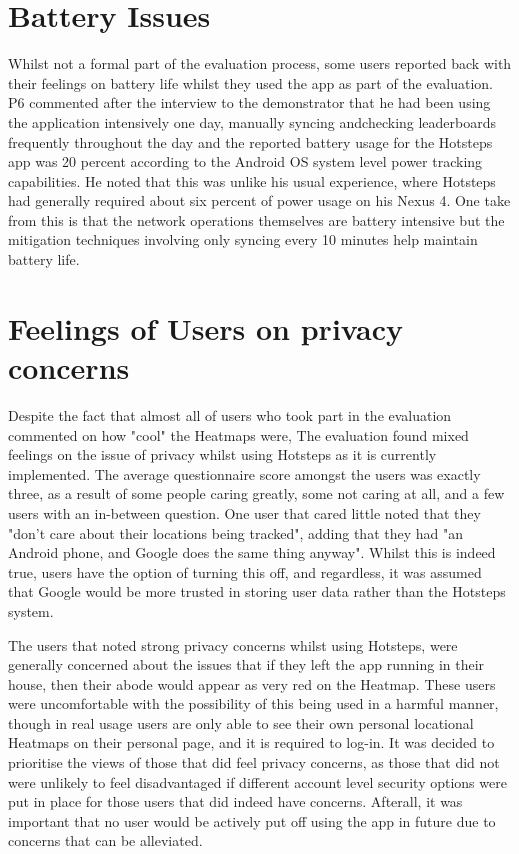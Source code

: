 \documentclass{l4proj}
\begin{document}
\section{Battery Issues}

Whilst not a formal part of the evaluation process, some users reported back with their feelings on battery life whilst they used the app as part of the evaluation. P6 commented after the interview to the demonstrator that he had been using the application intensively one day, manually syncing andchecking leaderboards frequently throughout the day and the reported battery usage for the Hotsteps app was 20 percent according to the Android OS system level power tracking capabilities.  He noted that this was unlike his usual experience, where Hotsteps had generally required about six percent of power usage on his Nexus 4. One take from this is that the network operations themselves are battery intensive but the mitigation techniques involving only syncing every 10 minutes help maintain battery life. 

\section{Feelings of Users on privacy concerns}

Despite the fact that almost all of users who took part in the evaluation commented on how "cool" the Heatmaps were, The evaluation found mixed feelings on the issue of privacy whilst using Hotsteps as it is currently implemented. The average questionnaire score amongst the users was exactly three, as a result of some people caring greatly, some not caring at all,  and a few users with an in-between question. One user that cared little noted that they "don't care about their locations being tracked", adding that they had "an Android phone, and Google does the same thing anyway". Whilst this is indeed true, users have the option of turning this off, and regardless, it was assumed that Google would be more trusted in storing user data rather than the Hotsteps system. 

The users that noted strong privacy concerns whilst using Hotsteps, were generally concerned about the issues that if they left the app running in their house, then their abode would appear as very red on the Heatmap. These users were uncomfortable with the possibility of this being used in a harmful manner, though  in real usage users are only able to see their own personal locational Heatmaps on their personal page, and it is required to log-in. It was decided to prioritise the views of those that did feel privacy concerns, as those that did not were unlikely to feel disadvantaged if different account level security options were put in place for those users that did indeed have concerns. Afterall, it was important that no user would be actively put off using the app in future due to concerns that can be alleviated.
\end{document}
